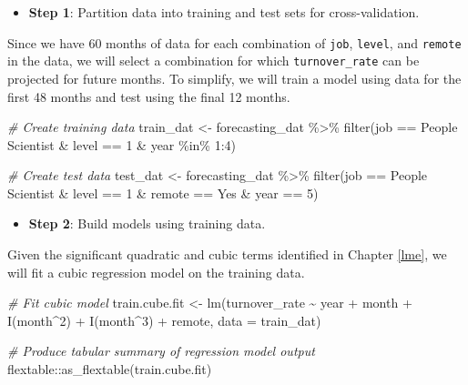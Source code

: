 \documentclass[
]{book}
\newenvironment{Shaded}{\begin{snugshade}}{\end{snugshade}}
\newcommand{\AttributeTok}[1]{\textcolor[rgb]{0.77,0.63,0.00}{#1}}
\newcommand{\CommentTok}[1]{\textcolor[rgb]{0.56,0.35,0.01}{\textit{#1}}}
\newcommand{\DecValTok}[1]{\textcolor[rgb]{0.00,0.00,0.81}{#1}}
\newcommand{\FunctionTok}[1]{\textcolor[rgb]{0.00,0.00,0.00}{#1}}
\newcommand{\NormalTok}[1]{#1}
\newcommand{\OtherTok}[1]{\textcolor[rgb]{0.56,0.35,0.01}{#1}}
\newcommand{\SpecialCharTok}[1]{\textcolor[rgb]{0.00,0.00,0.00}{#1}}
\newcommand{\StringTok}[1]{\textcolor[rgb]{0.31,0.60,0.02}{#1}}
\providecommand{\tightlist}{%
  \setlength{\itemsep}{0pt}\setlength{\parskip}{0pt}}
\begin{document}
\begin{itemize}
\tightlist
\item
  \textbf{Step 1}: Partition data into training and test sets for cross-validation.
\end{itemize}

Since we have 60 months of data for each combination of \texttt{job}, \texttt{level}, and \texttt{remote} in the data, we will select a combination for which \texttt{turnover\_rate} can be projected for future months. To simplify, we will train a model using data for the first 48 months and test using the final 12 months.

\begin{Shaded}
\begin{Highlighting}[]
\CommentTok{\# Create training data}
\NormalTok{train\_dat }\OtherTok{\textless{}{-}}\NormalTok{ forecasting\_dat }\SpecialCharTok{\%\textgreater{}\%} \FunctionTok{filter}\NormalTok{(job }\SpecialCharTok{==} \StringTok{\textquotesingle{}People Scientist\textquotesingle{}} \SpecialCharTok{\&}\NormalTok{ level }\SpecialCharTok{==} \DecValTok{1} \SpecialCharTok{\&}\NormalTok{ year }\SpecialCharTok{\%in\%} \DecValTok{1}\SpecialCharTok{:}\DecValTok{4}\NormalTok{)}

\CommentTok{\# Create test data}
\NormalTok{test\_dat }\OtherTok{\textless{}{-}}\NormalTok{ forecasting\_dat }\SpecialCharTok{\%\textgreater{}\%} \FunctionTok{filter}\NormalTok{(job }\SpecialCharTok{==} \StringTok{\textquotesingle{}People Scientist\textquotesingle{}} \SpecialCharTok{\&}\NormalTok{ level }\SpecialCharTok{==} \DecValTok{1} \SpecialCharTok{\&}\NormalTok{ remote }\SpecialCharTok{==} \StringTok{\textquotesingle{}Yes\textquotesingle{}} \SpecialCharTok{\&}\NormalTok{ year }\SpecialCharTok{==} \DecValTok{5}\NormalTok{)}
\end{Highlighting}
\end{Shaded}

\begin{itemize}
\tightlist
\item
  \textbf{Step 2}: Build models using training data.
\end{itemize}

Given the significant quadratic and cubic terms identified in Chapter \ref{lme}, we will fit a cubic regression model on the training data.

\begin{Shaded}
\begin{Highlighting}[]
\CommentTok{\# Fit cubic model}
\NormalTok{train.cube.fit }\OtherTok{\textless{}{-}} \FunctionTok{lm}\NormalTok{(turnover\_rate }\SpecialCharTok{\textasciitilde{}}\NormalTok{ year }\SpecialCharTok{+}\NormalTok{ month }\SpecialCharTok{+} \FunctionTok{I}\NormalTok{(month}\SpecialCharTok{\^{}}\DecValTok{2}\NormalTok{) }\SpecialCharTok{+} \FunctionTok{I}\NormalTok{(month}\SpecialCharTok{\^{}}\DecValTok{3}\NormalTok{) }\SpecialCharTok{+}\NormalTok{ remote, }\AttributeTok{data =}\NormalTok{ train\_dat)}

\CommentTok{\# Produce tabular summary of regression model output}
\NormalTok{flextable}\SpecialCharTok{::}\FunctionTok{as\_flextable}\NormalTok{(train.cube.fit)}
\end{Highlighting}
\end{Shaded}
\end{document}
